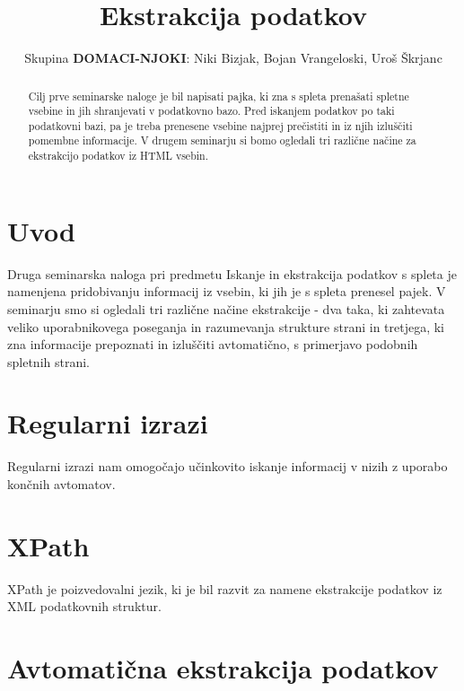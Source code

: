 \documentclass[conference]{IEEEtran}
\begin{document}
	
	\title{Ekstrakcija podatkov}
	
	\author{Skupina \textbf{DOMACI-NJOKI}: Niki Bizjak, Bojan Vrangeloski, Uroš Škrjanc}
	
	\maketitle
	
	\begin{abstract}
		Cilj prve seminarske naloge je bil napisati pajka, ki zna s spleta prenašati spletne vsebine in jih shranjevati v podatkovno bazo. Pred iskanjem podatkov po taki podatkovni bazi, pa je treba prenesene vsebine najprej prečistiti in iz njih izluščiti pomembne informacije. V drugem seminarju si bomo ogledali tri različne načine za ekstrakcijo podatkov iz HTML vsebin.
	\end{abstract}
	
	\IEEEpeerreviewmaketitle
	
	\section{Uvod}
	
	Druga seminarska naloga pri predmetu Iskanje in ekstrakcija podatkov s spleta je namenjena pridobivanju informacij iz vsebin, ki jih je s spleta prenesel pajek. V seminarju smo si ogledali tri različne načine ekstrakcije - dva taka, ki zahtevata veliko uporabnikovega poseganja in razumevanja strukture strani in tretjega, ki zna informacije prepoznati in izluščiti avtomatično, s primerjavo podobnih spletnih strani.
	
	\section{Regularni izrazi}
	
	Regularni izrazi nam omogočajo učinkovito iskanje informacij v nizih z uporabo končnih avtomatov.
	
	\section{XPath}
	
	XPath je poizvedovalni jezik, ki je bil razvit za namene ekstrakcije podatkov iz XML podatkovnih struktur.
	
	\section{Avtomatična ekstrakcija podatkov}
	
\end{document}
